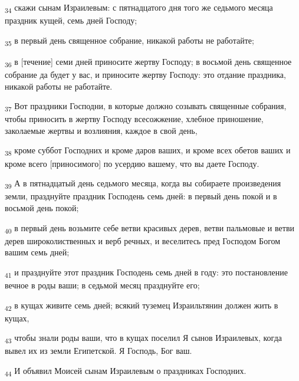 \begin{tcolorbox}
\textsubscript{34} скажи сынам Израилевым: с пятнадцатого дня того же седьмого месяца праздник кущей, семь дней Господу;
\end{tcolorbox}
\begin{tcolorbox}
\textsubscript{35} в первый день священное собрание, никакой работы не работайте;
\end{tcolorbox}
\begin{tcolorbox}
\textsubscript{36} в [течение] семи дней приносите жертву Господу; в восьмой день священное собрание да будет у вас, и приносите жертву Господу: это отдание праздника, никакой работы не работайте.
\end{tcolorbox}
\begin{tcolorbox}
\textsubscript{37} Вот праздники Господни, в которые должно созывать священные собрания, чтобы приносить в жертву Господу всесожжение, хлебное приношение, заколаемые жертвы и возлияния, каждое в свой день,
\end{tcolorbox}
\begin{tcolorbox}
\textsubscript{38} кроме суббот Господних и кроме даров ваших, и кроме всех обетов ваших и кроме всего [приносимого] по усердию вашему, что вы даете Господу.
\end{tcolorbox}
\begin{tcolorbox}
\textsubscript{39} А в пятнадцатый день седьмого месяца, когда вы собираете произведения земли, празднуйте праздник Господень семь дней: в первый день покой и в восьмой день покой;
\end{tcolorbox}
\begin{tcolorbox}
\textsubscript{40} в первый день возьмите себе ветви красивых дерев, ветви пальмовые и ветви дерев широколиственных и верб речных, и веселитесь пред Господом Богом вашим семь дней;
\end{tcolorbox}
\begin{tcolorbox}
\textsubscript{41} и празднуйте этот праздник Господень семь дней в году: это постановление вечное в роды ваши; в седьмой месяц празднуйте его;
\end{tcolorbox}
\begin{tcolorbox}
\textsubscript{42} в кущах живите семь дней; всякий туземец Израильтянин должен жить в кущах,
\end{tcolorbox}
\begin{tcolorbox}
\textsubscript{43} чтобы знали роды ваши, что в кущах поселил Я сынов Израилевых, когда вывел их из земли Египетской. Я Господь, Бог ваш.
\end{tcolorbox}
\begin{tcolorbox}
\textsubscript{44} И объявил Моисей сынам Израилевым о праздниках Господних.
\end{tcolorbox}
